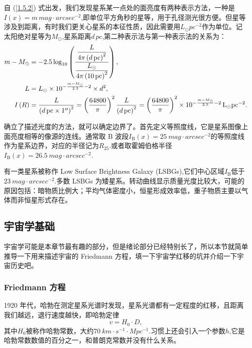 \documentclass[../天体物理基础.tex]{subfiles}
\begin{document}
自 (\ref{1.5.2}) 式出发，我们发现星系某一点处的面亮度有两种表示方法，一种是$I\left(x\right)=m\,\unit{mag\cdot arcsec^{-2}}$,即单位平方角秒的星等，用于孔径测光很方便。但星等涉及到距离，有时我们更关心星系的本征性质，因此需要用$\unit{L_{\odot}pc^{-2}}$作为单位。记太阳绝对星等为$M_{\odot}$,星系距离$d\,\unit{pc}$,第二种表示法与第一种表示法的关系为：
\begin{align}
m-M_{\odot}&=-2.5\log_{10}\left(\frac{\dfrac{L}{4\pi\left(d\,\unit{pc}\right)^{2}}}{\dfrac{L_{\odot}}{4\pi\left(\qty{10}{pc}\right)^{2}}}\right),\notag\\
L&=L_{\odot}\times10^{-\frac{m-M_{\odot}}{2.5}-2}\times d^{2},\notag\\
I\left(R\right)&=\frac{L}{\left(d\,\unit{pc}\times1^{\prime\prime}\right)^{2}}=\left(\frac{64800}{\pi}\right)^{2}\frac{L}{\left(d\,\unit{pc}\right)^{2}}=\left(\frac{64800}{\pi}\right)^{2}\times10^{-\frac{m-M_{\odot}}{2.5}-2}\,\unit{L_{\odot}pc^{-2}}.
\end{align}

确立了描述光度的方法，就可以确定边界了。首先定义等照度线，它是星系图像上面亮度相等的像源的连线。通常取 B 波段$I_{\text{B}}(x)=\qty{25}{mag\cdot{}arcsec^{-2}}$的等照度线作为星系边界，对应的半径记为$R_{25}$.或者取霍姆伯格半径$I_{\text{B}}(x)=\qty{26.5}{mag\cdot{}arcsec^{-2}}$.

有一类星系被称作 Low Surface Brightness Galaxy (LSBGs),它们中心区域$I_{\text{B}}$低于$\qty{23}{mag\cdot{}arcsec^{-2}}$.多数 LSBGs 为矮星系。转动曲线显示质量光度比较大，可能的原因包括：暗物质比例大；平均气体密度小，恒星形成效率低，重子物质主要以气体而非恒星形式存在。

\subsection{宇宙学基础}
宇宙学可能是本章节最有趣的部分，但是绪论部分已经特别长了，所以本节就简单推导一下用来描述宇宙的 Friedmann 方程，填一下宇宙学红移的坑并介绍一下宇宙历史吧。

\subsubsection{Friedmann 方程}
1920 年代，哈勃在测定星系光谱时发现，星系光谱都有一定程度的红移，且距离我们越远，退行速度越快，即哈勃定律
\begin{equation}
v=H_{0}\cdot D,
\end{equation}
其中$H_{0}$被称作哈勃常数，大约$\qty{70}{km\cdot{}s^{-1}\cdot{}Mpc^{-1}}$.习惯上还会引入一个参数$h$,它是哈勃常数数值的百分之一，和普朗克常数并没有什么关系。
\end{document}
